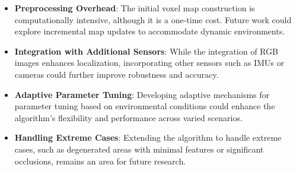 \begin{itemize}
    \item \textbf{Preprocessing Overhead}: The initial voxel map construction is computationally intensive, although it is a one-time cost. Future work could explore incremental map updates to accommodate dynamic environments.
    \item \textbf{Integration with Additional Sensors}: While the integration of RGB images enhances localization, incorporating other sensors such as IMUs or cameras could further improve robustness and accuracy.
    \item \textbf{Adaptive Parameter Tuning}: Developing adaptive mechanisms for parameter tuning based on environmental conditions could enhance the algorithm's flexibility and performance across varied scenarios.
    \item \textbf{Handling Extreme Cases}: Extending the algorithm to handle extreme cases, such as degenerated areas with minimal features or significant occlusions, remains an area for future research.
\end{itemize}

